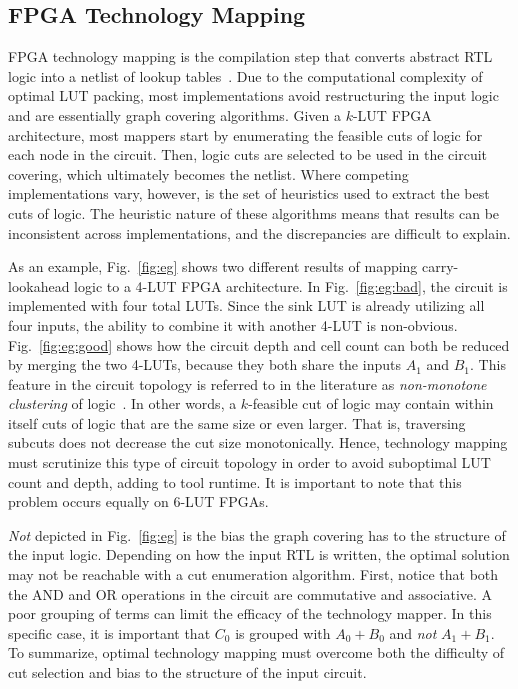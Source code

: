 \subsection{FPGA Technology Mapping}\label{sec:background:fpga}
FPGA technology mapping is the compilation step that converts abstract RTL
logic into a netlist of lookup tables~\cite{flowmap, daomap, attmap, imap,
    wiremap}. Due to the computational complexity of optimal LUT packing, most
implementations avoid restructuring the input logic and are essentially graph
covering algorithms. Given a $k$-LUT FPGA architecture, most mappers start by
enumerating the feasible cuts of logic for each node in the circuit. Then,
logic cuts are selected to be used in the circuit covering, which ultimately
becomes the netlist. Where competing implementations vary, however, is the set
of heuristics used to extract the best cuts of logic. The heuristic nature of
these algorithms means that results can be inconsistent across implementations,
and the discrepancies are difficult to explain.

As an example, Fig.~\ref{fig:eg} shows two different results of mapping
carry-lookahead logic to a 4-LUT FPGA architecture. In Fig.~\ref{fig:eg:bad},
the circuit is implemented with four total LUTs. Since the sink LUT is already
utilizing all four inputs, the ability to combine it with another 4-LUT is
non-obvious. Fig.~\ref{fig:eg:good} shows how the circuit depth and cell count
can both be reduced by merging the two 4-LUTs, because they both share the
inputs $A_1$ and $B_1$. This feature in the circuit topology is referred to in
the literature as \textit{non-monotone clustering} of logic~\cite{flowmap}. In
other words, a $k$-feasible cut of logic may contain within itself cuts of
logic that are the same size or even larger. That is, traversing subcuts does
not decrease the cut size monotonically. Hence, technology mapping must
scrutinize this type of circuit topology in order to avoid suboptimal LUT count
and depth, adding to tool runtime. It is important to note that this problem
occurs equally on 6-LUT FPGAs.

\textit{Not} depicted in Fig.~\ref{fig:eg} is the bias the graph
covering has to the structure of the input logic. Depending on how the input
RTL is written, the optimal solution may not be reachable with a cut
enumeration algorithm. First, notice that both the AND and OR operations in the
circuit are commutative and associative. A poor grouping of terms can limit the
efficacy of the technology mapper. In this specific case, it is important that
$C_0$ is grouped with $A_0 + B_0$ and \textit{not} $A_1 + B_1$. To summarize,
optimal technology mapping must overcome both the difficulty of cut selection
and bias to the structure of the input circuit.

